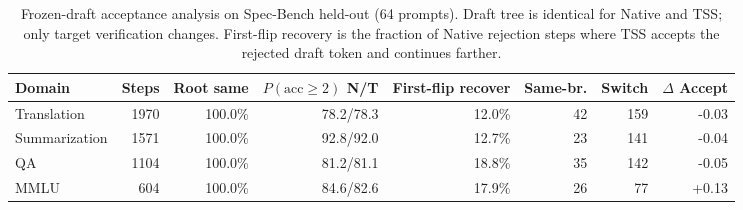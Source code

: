 \begin{table}[t]
\centering
\small
\caption{Frozen-draft acceptance analysis on Spec-Bench held-out (64 prompts). Draft tree is identical for Native and TSS; only target verification changes. First-flip recovery is the fraction of Native rejection steps where TSS accepts the rejected draft token and continues farther.}
\label{tab:tss_accept_survival_firstflip}
\begin{tabular}{lrrrrrrr}
\toprule
Domain & Steps & Root same & $P(\mathrm{acc}\!\ge\!2)$ N/T & First-flip recover & Same-br. & Switch & $\Delta$ Accept \\
\midrule
Translation & 1970 & 100.0\% & 78.2/78.3 & 12.0\% & 42 & 159 & -0.03 \\
Summarization & 1571 & 100.0\% & 92.8/92.0 & 12.7\% & 23 & 141 & -0.04 \\
QA & 1104 & 100.0\% & 81.2/81.1 & 18.8\% & 35 & 142 & -0.05 \\
MMLU & 604 & 100.0\% & 84.6/82.6 & 17.9\% & 26 & 77 & +0.13 \\
\bottomrule
\end{tabular}
\end{table}
